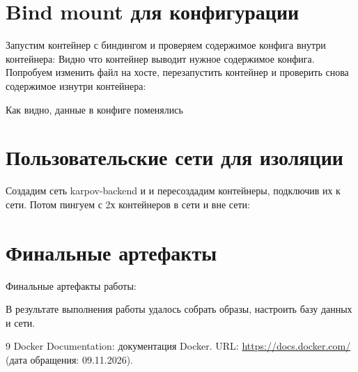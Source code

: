 \chapter{Bind mount для конфигурации}

Запустим контейнер с биндингом и проверяем содержимое конфига внутри контейнера:
Видно что контейнер выводит нужное содержимое конфига. Попробуем изменить файл на хосте, перезапустить контейнер и проверить снова содержимое изнутри контейнера:

Как видно, данные в конфиге поменялись

\chapter{Пользовательские сети для изоляции}

Создадим сеть karpov-backend и и пересоздадим контейнеры, подключив их к сети. Потом пингуем с 2х контейнеров в сети и вне сети:

\chapter{Финальные артефакты}
Финальные артефакты работы:







В результате выполнения работы удалось собрать образы, настроить базу данных и сети.

\begin{thebibliography}{9}
  Docker Documentation: документация Docker.
  URL: \url{https://docs.docker.com/}
  (дата обращения: 09.11.2026).
\end{thebibliography}


